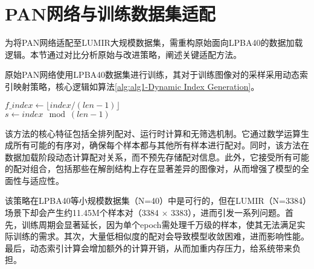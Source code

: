 


\section{PAN网络与训练数据集适配}

为将PAN网络适配至LUMIR大规模数据集，需重构原始面向LPBA40的数据加载逻辑。本节通过对比分析原始与改进策略，阐述关键适配方法。

原始PAN网络使用LPBA40数据集进行训练，其对于训练图像对的采样采用动态索引映射策略，核心逻辑如算法\ref{alg:alg1-Dynamic Index Generation}。

\begin{algorithm}

    \label{alg:alg1-Dynamic Index Generation}

    $f\_index \gets \lfloor index / (len-1) \rfloor$ \\
    $s \gets index \mod (len-1)$ \\
\end{algorithm}


该方法的核心特征包括全排列配对、运行时计算和无筛选机制。它通过数学运算生成所有可能的有序对，确保每个样本都与其他所有样本进行配对。同时，该方法在数据加载阶段动态计算配对关系，而不预先存储配对信息。此外，它接受所有可能的配对组合，包括那些在解剖结构上存在显著差异的图像对，从而增强了模型的全面性与适应性。

该策略在LPBA40等小规模数据集（N=40）中是可行的，但在LUMIR（N=3384）场景下却会产生约11.45M个样本对（3384 $\times$ 3383），进而引发一系列问题。首先，训练周期会显著延长，因为单个epoch需处理千万级的样本，使其无法满足实际训练的需求。其次，大量低相似度的配对会导致模型收敛困难，进而影响性能。最后，动态索引计算会增加额外的计算开销，从而加重内存压力，给系统带来负担。

